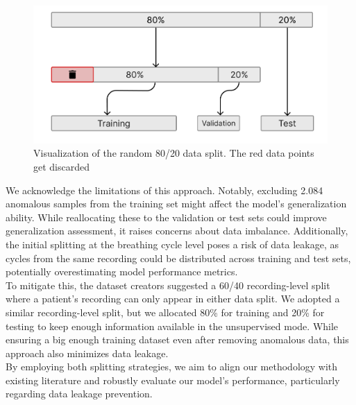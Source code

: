 \begin{figure}[h!]
    \includegraphics[width=\linewidth]{images/split}
    \caption{
    Visualization of the random 80/20 data split. The red data points get discarded
}\label{fig:split}
\end{figure}

We acknowledge the limitations of this approach. Notably, excluding 2.084 anomalous samples from the training set might affect the model's generalization ability. While reallocating these to the validation or test sets could improve generalization assessment, it raises concerns about data imbalance. Additionally, the initial splitting at the breathing cycle level poses a risk of data leakage, as cycles from the same recording could be distributed across training and test sets, potentially overestimating model performance metrics.\\
To mitigate this, the dataset creators suggested a 60/40 recording-level split where a patient's recording can only appear in either data split. We adopted a similar recording-level split, but we allocated 80\% for training and 20\% for testing to keep enough information available in the unsupervised mode. While ensuring a big enough training dataset even after removing anomalous data, this approach also minimizes data leakage.\\
By employing both splitting strategies, we aim to align our methodology with existing literature and robustly evaluate our model's performance, particularly regarding data leakage prevention.

